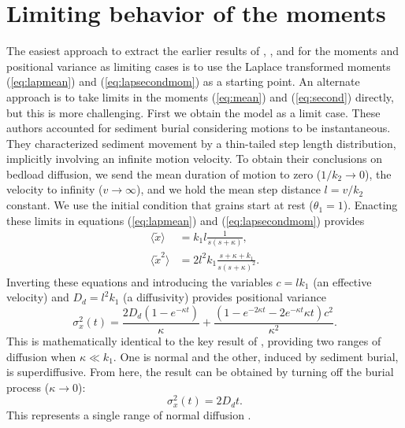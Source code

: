 \documentclass[]{agujournal2018}
\newcommand\be{\begin{equation}}
\newcommand\ee{\end{equation}}
\newcommand\bra{\langle}
\newcommand\ket{\rangle}
\begin{document}
\section{Limiting behavior of the moments}
\label{sec:appendixC}
The easiest approach to extract the earlier results of \cite{Wu2019}, \citet{Lisle1998}, and \citet{Einstein1937} for the moments and positional variance as limiting cases is to use the Laplace transformed moments (\ref{eq:lapmean}) and (\ref{eq:lapsecondmom}) as a starting point.
An alternate approach is to take limits in the moments (\ref{eq:mean}) and (\ref{eq:second}) directly, but this is more challenging.
First we obtain the \citet{Wu2019} model as a limit case. 
These authors accounted for sediment burial considering motions to be instantaneous.
They characterized sediment movement by a thin-tailed step length distribution, implicitly involving an infinite motion velocity.
To obtain their conclusions on bedload diffusion, we send the mean duration of motion to zero ($1/k_2\rightarrow 0$), the velocity to infinity ($v\rightarrow \infty$), and we hold the mean step distance $l = v/k_2$ constant.
We use the initial condition that grains start at rest ($\theta_1=1$).
Enacting these limits in equations (\ref{eq:lapmean}) and (\ref{eq:lapsecondmom}) provides
\begin{align}
\bra \tilde{x} \ket &= k_1l\frac{1}{s(s+\kappa)},\\
\bra \tilde{x}^2 \ket &= 2l^2k_1 \frac{s+\kappa+k_1}{s(s+\kappa)^2}.
\end{align}
Inverting these equations and introducing the variables $c=lk_1$ (an effective velocity) and $D_d = l^2k_1$ (a diffusivity) provides positional variance
\be \sigma_x^2(t) = \frac{2D_d(1-e^{-\kappa t})}{\kappa} + \frac{(1-e^{-2\kappa t}-2e^{-\kappa t}\kappa t)c^2}{\kappa^2}.\ee
This is mathematically identical to the key result of \citet{Wu2019}, providing two ranges of diffusion when $\kappa \ll k_1$. One is normal and the other, induced by sediment burial, is superdiffusive.
From here, the \citet{Einstein1937} result can be obtained by turning off the burial process ($\kappa \rightarrow 0$):
\be \sigma_x^2(t) = 2D_d t.\ee
This represents a single range of normal diffusion \citep[cf.][]{Hubbell1964,Nakagawa1976}.
\end{document}
